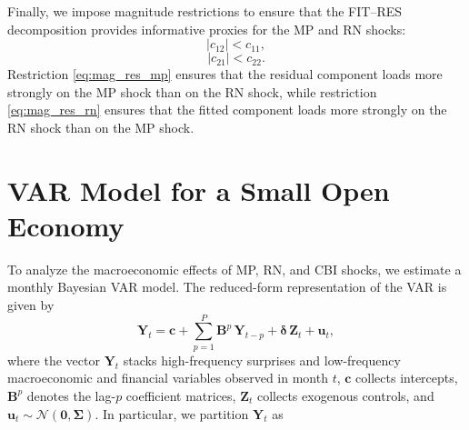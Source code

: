 \documentclass[12pt, reqno]{article}
\begin{document}
Finally, we impose magnitude restrictions to ensure that the FIT--RES decomposition provides informative proxies for the MP and RN shocks:
\begin{equation}
\label{eq:mag_res_mp}
|c_{12}| < c_{11},
\end{equation}
\begin{equation}
\label{eq:mag_res_rn}
|c_{21}| < c_{22}.
\end{equation}
Restriction \eqref{eq:mag_res_mp} ensures that the residual component loads more strongly on the MP shock than on the RN shock, while restriction \eqref{eq:mag_res_rn} ensures that the fitted component loads more strongly on the RN shock than on the MP shock. 



\section{VAR Model for a Small Open Economy}
\hypertarget{Section 4}{}

To analyze the macroeconomic effects of MP, RN, and CBI shocks, we estimate a monthly Bayesian VAR model. The reduced-form representation of the VAR is given by
\begin{equation}
  \boldsymbol{Y}_t
  = \boldsymbol{c}
  + \sum_{p=1}^{P} \boldsymbol{B}^{p}\,\boldsymbol{Y}_{t-p}
  + \boldsymbol{\delta}\,\boldsymbol{Z}_t
  + \boldsymbol{u}_t ,
\end{equation}
where the vector $\boldsymbol{Y}_t$ stacks high-frequency surprises and low-frequency macroeconomic and financial variables observed in month $t$, $\boldsymbol{c}$ collects intercepts, $\boldsymbol{B}^{p}$ denotes the lag-$p$ coefficient matrices, $\boldsymbol{Z}_t$ collects exogenous controls, and $\boldsymbol{u}_t \sim \mathcal{N}\!\left(\mathbf{0},\boldsymbol{\Sigma}\right)$. In particular, we partition $\boldsymbol{Y}_t$ as
\end{document}
